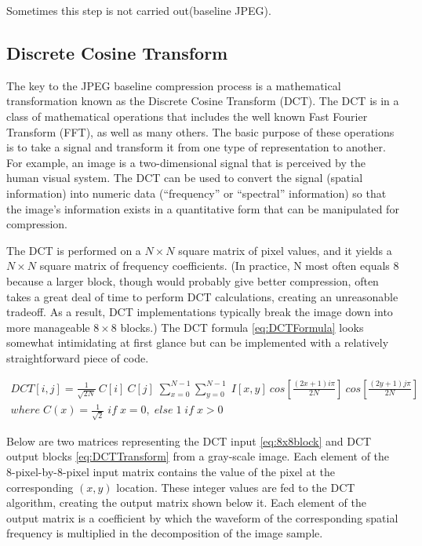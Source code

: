 Sometimes this step is not carried out(baseline JPEG).

\subsection{Discrete Cosine Transform}

The key to the JPEG baseline compression process is a mathematical transformation known as the Discrete Cosine Transform (DCT). The DCT is in a class of mathematical operations that includes the well known Fast Fourier Transform (FFT), as well as many others. The basic purpose of these operations is to take a signal and transform it from one type of representation to another. For example, an image is a two-dimensional signal that is perceived by the human visual system. The DCT can be used to convert the signal (spatial information) into numeric data (“frequency” or “spectral” information) so that the image's information exists in a quantitative form that can be manipulated for compression.

The DCT is performed on a $N \times N$ square matrix of pixel values, and it yields a $N \times N$ square matrix of frequency coefficients. (In practice, N most often equals 8 because a larger block, though would probably give better compression, often takes a great deal of time to perform DCT calculations, creating an unreasonable tradeoff. As a result, DCT implementations typically break the image down into more manageable $8 \times 8$ blocks.) The DCT formula \ref{eq:DCTFormula} looks somewhat intimidating at first glance but can be implemented with a relatively straightforward piece of code.

\begin{equation}
    \begin{split}
    DCT[i,j] = \frac{1}{\sqrt{2N}} \: C[i] \: C[j] \; \sum_{x=0}^{N-1} \sum_{y=0}^{N-1} \; I[x,y] \: cos[\frac{(2x + 1)i\pi}{2N}] \: cos[\frac{(2y + 1)j\pi}{2N}]  \\
    where \; C(x) = \frac{1}{\sqrt{2}} \; if \; x=0, \; else \;1 \; if \; x>0
    \end{split}
    \label{eq:DCTFormula}
\end{equation}

Below are two matrices representing the DCT input \ref{eq:8x8block} and DCT output blocks \ref{eq:DCTTransform} from a gray-scale image. Each element of the 8-pixel-by-8-pixel input matrix contains the value of the pixel at the corresponding $(x, y)$ location. These integer values are fed to the DCT algorithm, creating the output matrix shown below it. Each element of the output matrix is a coefficient by which the waveform of the corresponding spatial frequency is multiplied in the decomposition of the image sample.

